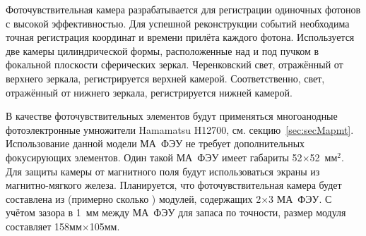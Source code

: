 Фоточувствительная камера разрабатывается для регистрации одиночных фотонов с высокой эффективностью. Для успешной реконструкции событий необходима точная регистрация координат и времени прилёта каждого фотона.
Используется две камеры цилиндрической формы, расположенные над и под пучком в фокальной плоскости сферических зеркал. Черенковский свет, отражённый от верхнего зеркала, регистрируется верхней камерой. Соответственно, свет, отражённый от нижнего зеркала, регистрируется нижней камерой.

В качестве фоточувствительных элементов будут применяться многоанодные фотоэлектронные умножители Hamamatsu H12700, см. секцию~\ref{sec:secMapmt}. Использование данной модели МА~ФЭУ не требует дополнительных фокусирующих элементов.
Один такой МА~ФЭУ имеет габариты 52$\times$52~мм$^2$. Для защиты камеры от магнитного поля будут использоваться экраны из магнитно-мягкого железа.
Планируется, что фоточувствительная камера будет составлена из (примерно сколько \todo) модулей, содержащих 2$\times$3 МА~ФЭУ. С учётом зазора в 1~мм между МА~ФЭУ для запаса по точности, размер модуля составляет 158мм$\times$105мм.

